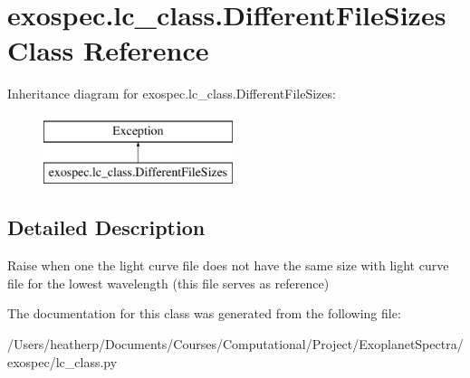 \hypertarget{classexospec_1_1lc__class_1_1_different_file_sizes}{}\section{exospec.\+lc\+\_\+class.\+Different\+File\+Sizes Class Reference}
\label{classexospec_1_1lc__class_1_1_different_file_sizes}
Inheritance diagram for exospec.\+lc\+\_\+class.\+Different\+File\+Sizes\+:\begin{figure}[H]
\begin{center}
\leavevmode
\includegraphics[height=2.000000cm]{classexospec_1_1lc__class_1_1_different_file_sizes}
\end{center}
\end{figure}


\subsection{Detailed Description}
\begin{DoxyVerb}Raise when one the light curve file does not have the same size with light curve file for the lowest wavelength (this file serves as reference)\end{DoxyVerb}
 

The documentation for this class was generated from the following file\+:\begin{DoxyCompactItemize}
\item 
/\+Users/heatherp/\+Documents/\+Courses/\+Computational/\+Project/\+Exoplanet\+Spectra/exospec/lc\+\_\+class.\+py\end{DoxyCompactItemize}

